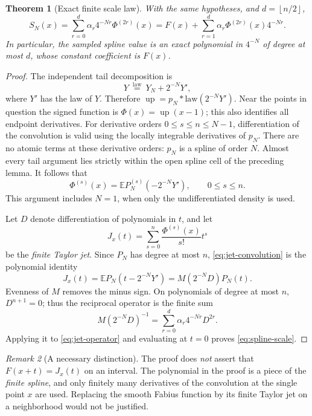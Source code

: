 \documentclass[11pt,a4paper]{article}
\newtheorem{theorem}{Theorem}[section]
\theoremstyle{definition}
\theoremstyle{remark}
\newtheorem{remark}[theorem]{Remark}
\newcommand{\Up}{\operatorname{up}}
\newcommand{\E}{\mathbb E}
\newcommand{\floor}[1]{\left\lfloor #1\right\rfloor}
\begin{document}
\begin{theorem}[Exact finite scale law]
With the same hypotheses, and \(d=\floor{n/2}\),
\begin{equation}
 \boxed{\displaystyle
 S_N(x)=\sum_{r=0}^{d}\alpha_r4^{-Nr}\Phi^{(2r)}(x)
       =F(x)+\sum_{r=1}^{d}\alpha_r\Phi^{(2r)}(x)4^{-Nr}.}
                                                               \label{eq:spline-scale}
\end{equation}
In particular, the sampled spline value is an exact polynomial in \(4^{-N}\)
of degree at most \(d\), whose constant coefficient is \(F(x)\).
\end{theorem}
\begin{proof}
The independent tail decomposition is
\[
 Y\ \stackrel{\mathrm{law}}=\ Y_N+2^{-N}Y',
\]
where \(Y'\) has the law of \(Y\).  Therefore
\(\Up=p_N*\mathrm{law}(2^{-N}Y')\).  Near the points in question the signed
function is \(\Phi(x)=\Up(x-1)\); this also identifies all endpoint derivatives.
For derivative orders \(0\leq s\leq n\leq N-1\), differentiation of the
convolution is valid using the locally integrable derivatives of \(p_N\).
There are no atomic terms at these derivative orders: \(p_N\) is a spline of
order \(N\).  Almost every tail argument lies strictly within the open spline
cell of the preceding lemma.  It follows that
\begin{equation}
 \Phi^{(s)}(x)=\E P_N^{(s)}(-2^{-N}Y'),\qquad 0\leq s\leq n.
                                                               \label{eq:jet-convolution}
\end{equation}
This argument includes \(N=1\), when only the undifferentiated density is used.

Let \(D\) denote differentiation of polynomials in \(t\), and let
\[
 J_x(t)=\sum_{s=0}^{n}\frac{\Phi^{(s)}(x)}{s!}t^s
\]
be the \emph{finite Taylor jet}.  Since \(P_N\) has degree at most \(n\),
\eqref{eq:jet-convolution} is the polynomial identity
\begin{equation}
 J_x(t)=\E P_N(t-2^{-N}Y')=M(2^{-N}D)P_N(t).           \label{eq:jet-operator}
\end{equation}
Evenness of \(M\) removes the minus sign.  On polynomials of degree at most \(n\),
\(D^{n+1}=0\); thus the reciprocal operator is the finite sum
\[
 M(2^{-N}D)^{-1}=\sum_{r=0}^{d}\alpha_r4^{-Nr}D^{2r}.
\]
Applying it to \eqref{eq:jet-operator} and evaluating at \(t=0\) proves
\eqref{eq:spline-scale}.
\end{proof}

\begin{remark}[A necessary distinction]
The proof does \emph{not} assert that \(F(x+t)=J_x(t)\) on an interval.  The
polynomial in the proof is a piece of the \emph{finite spline}, and only finitely
many derivatives of the convolution at the single point \(x\) are used.
Replacing the smooth Fabius function by its finite Taylor jet on a neighborhood
would not be justified.
\end{remark}
\end{document}
